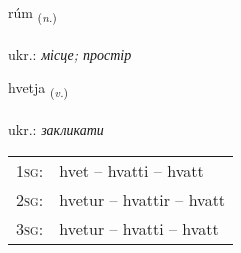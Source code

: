\documentclass[frontgrid, backgrid]{flacards}\usepackage[]{graphicx}\usepackage[]{xcolor}
\begin{document}
\renewcommand{\blhead}{\vskip5pt {\small\bfseries\footnotesize Nafnorð | іменник }}
\renewcommand{\bcfoot}{\vskip5pt \hspace{2pt}{\small\bfseries\footnotesize 1K}}


{rúm \small{\textsubscript{(\textit{n.})}} \\[1ex] %
\textphonetic{[ruːm]} \\
ukr.: \emph{місце; простір} \\  [2ex]
\renewcommand*{\arraystretch}{0.8}
}

\renewcommand{\flhead}{\vskip5pt \fboxsep=0pt {\small\bfseries\footnotesize Sagnorð | дієслово}}
\renewcommand{\fcfoot}{\vskip5pt \fboxsep=0pt \hspace{2pt}{\small\bfseries\footnotesize 1K}}

\renewcommand{\blhead}{\vskip5pt {\small\bfseries\footnotesize Sagnorð | дієслово }}
\renewcommand{\bcfoot}{\vskip5pt \hspace{2pt}{\small\bfseries\footnotesize 1K}}


{hvetja \small{\textsubscript{(\textit{v.})}} \\[1ex] %
\textphonetic{[kʰvɛːtja]} \\
ukr.: \emph{закликати} \\  [2ex]
\renewcommand*{\arraystretch}{0.8}
\begin{tabular}{p{1cm}l}
\textsc{1sg}: & hvet -- hvatti -- hvatt \\ 
\textsc{2sg}: & hvetur -- hvattir -- hvatt \\ 
\textsc{3sg}: & hvetur -- hvatti -- hvatt \\ 
\end{tabular}
}

\renewcommand{\flhead}{\vskip5pt \fboxsep=0pt {\small\bfseries\footnotesize Sagnorð | дієслово}}
\renewcommand{\fcfoot}{\vskip5pt \fboxsep=0pt \hspace{2pt}{\small\bfseries\footnotesize 1K}}
\end{document}
